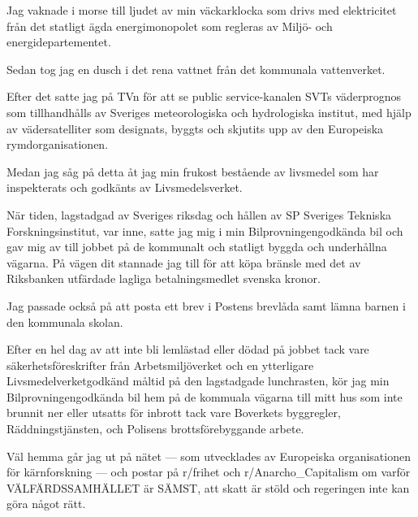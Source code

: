 \documentclass[a4paper,12pt]{article}
\newcommand{\leblanc}{\clearpage\thispagestyle{empty}\null\clearpage}
\begin{document}
\begin{sammanfattning}
% 
Jag vaknade i morse till ljudet av min väckarklocka som drivs med elektricitet från det
statligt ägda energimonopolet som regleras av Miljö- och energidepartementet.

Sedan tog jag en dusch i det rena vattnet från det kommunala vattenverket.

Efter det satte jag på TVn för att se public service-kanalen SVTs väderprognos som
tillhandhålls av Sveriges meteorologiska och hydrologiska institut, med hjälp av
vädersatelliter som designats, byggts och skjutits upp av den Europeiska
rymdorganisationen.

Medan jag såg på detta åt jag min frukost bestående av livsmedel som har inspekterats och
godkänts av Livsmedelsverket.

När tiden, lagstadgad av Sveriges riksdag och hållen av SP Sveriges Tekniska
Forskningsinstitut, var inne, satte jag mig i min Bilprovningengodkända bil och gav mig av
till jobbet på de kommunalt och statligt byggda och underhållna vägarna. På vägen dit
stannade jag till för att köpa bränsle med det av Riksbanken utfärdade lagliga
betalningsmedlet svenska kronor.

Jag passade också på att posta ett brev i Postens brevlåda samt lämna barnen i den
kommunala skolan.

Efter en hel dag av att inte bli lemlästad eller dödad på jobbet tack vare
säkerhetsföreskrifter från Arbetsmiljöverket och en ytterligare Livsmedelverketgodkänd
måltid på den lagstadgade lunchrasten, kör jag min Bilprovningengodkända bil hem på de
kommuala vägarna till mitt hus som inte brunnit ner eller utsatts för inbrott tack vare
Boverkets byggregler, Räddningstjänsten, och Polisens brottsförebyggande arbete.

Väl hemma går jag ut på nätet — som utvecklades av Europeiska organisationen för
kärnforskning — och postar på r/frihet och r/Anarcho\_Capitalism om varför
VÄLFÄRDSSAMHÄLLET är SÄMST, att skatt är stöld och regeringen inte kan göra något rätt.
\end{sammanfattning}

\leblanc

\tableofcontents

\cleardoublepage

\mainmatter

\end{document}
